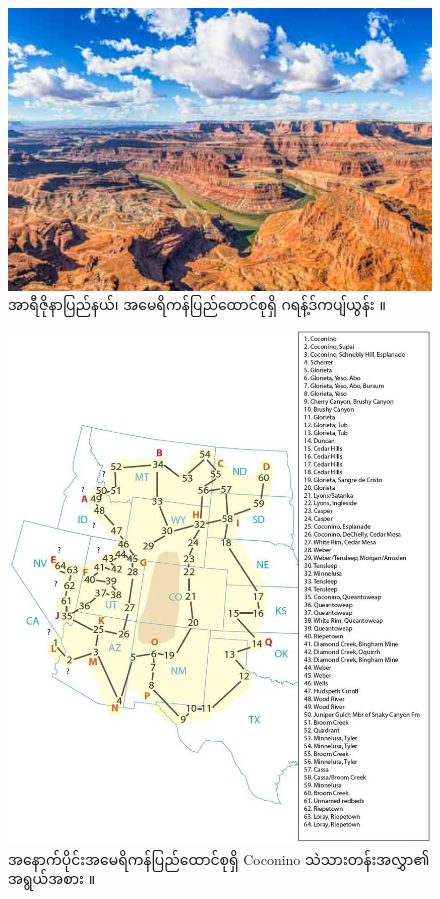 \documentclass[10pt,twocolumn,letterpaper]{article}
\begin{document}
\begin{figure}[b]
\begin{center}
   \includegraphics[width=1\linewidth]{grand-canyon.jpg}

\end{center}
   \caption{အာရီဇိုနာပြည်နယ်၊ အမေရိကန်ပြည်ထောင်စုရှိ ဂရန့်ဒ်ကပျ်ယွန်း \cite{49}။}
\label{fig:2}
\label{fig:onecol}
\end{figure}

\begin{figure}[t]
\begin{center}
   \includegraphics[width=1\linewidth]{coconino.jpg}
\end{center}
   \caption{အနောက်ပိုင်းအမေရိကန်ပြည်ထောင်စုရှိ Coconino သဲသားတန်းအလွှာ၏ အရွယ်အစား \cite{21}။}
\label{fig:3}
\label{fig:onecol}
\end{figure}
\end{document}

